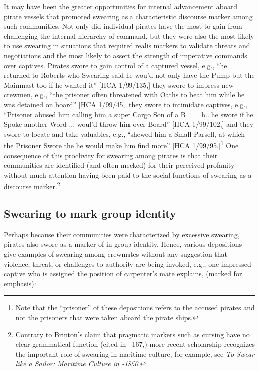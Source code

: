   It may have been the greater opportunities for internal advancement aboard pirate vessels that promoted swearing as a characteristic discourse marker among such communities. Not only did individual pirates have the most to gain from challenging the internal hierarchy of command, but they were also the most likely to use swearing in situations that required realis markers to validate threats and negotiations and the most likely to assert the strength of imperative commands over captives. Pirates swore to gain control of a captured vessel, e.g., “he returned to Roberts who Swearing said he wou’d not only have the Pump but the Mainmast too if he wanted it” [HCA 1/99/135,] they swore to impress new crewmen, e.g., “the prisoner often threatened with Oaths to beat him while he was detained on board” [HCA 1/99/45,] they swore to intimidate captives, e.g., “Prisoner abused him calling him a super Cargo Son of a B\_\_\_h...he swore if he Spoke another Word ... woul’d throw him over Board” [HCA 1/99/102,] and they swore to locate and take valuables, e.g., “shewed him a Small Parsell, at which the Prisoner Swore the he would make him find more” [HCA 1/99/95.]\footnote{Note that the “prisoner” of these depositions refers to the accused pirates and not the prisoners that were taken aboard the pirate ships.}  One consequence of this proclivity for swearing among pirates is that their communities are identified (and often mocked) for their perceived profanity without much attention having been paid to the social functions of swearing as a discourse marker.\footnote{Contrary to Brinton’s claim that pragmatic markers such as cursing have no clear grammatical function (cited in \citealt{ClaridgeArnovick2010}: 167,) more recent scholarship recognizes the important role of swearing in maritime culture, for example, see  \textit{To Swear like a Sailor: Maritime Culture in \citealt{America1750}-1850}.} 

\subsection{{Swearing} {to} {mark} {group} {identity}}%

Perhaps because their communities were characterized by excessive swearing, pirates also swore as a marker of in-group identity. Hence, various depositions give examples of swearing among crewmates without any suggestion that violence, threat, or challenges to authority are being invoked, e.g., one impressed captive who is assigned the position of carpenter’s mate explains, (marked for emphasis): 

